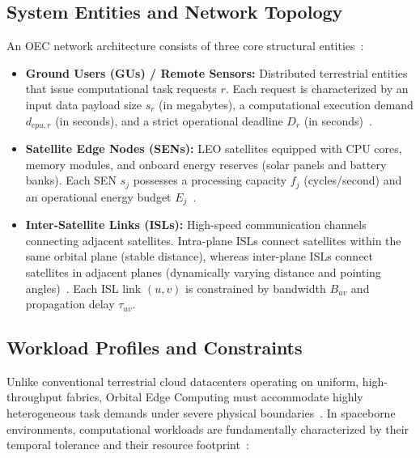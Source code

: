 \subsection{System Entities and Network Topology}

An OEC network architecture consists of three core structural entities~\cite{icdcs_satellite_2025, walker1984satellite}:
\begin{itemize}
    \item \textbf{Ground Users (GUs) / Remote Sensors:} Distributed terrestrial entities that issue computational task requests $r$. Each request is characterized by an input data payload size $s_r$ (in megabytes), a computational execution demand $d_{cpu,r}$ (in seconds), and a strict operational deadline $D_r$ (in seconds)~\cite{icdcs_satellite_2025}.
    \item \textbf{Satellite Edge Nodes (SENs):} LEO satellites equipped with CPU cores, memory modules, and onboard energy reserves (solar panels and battery banks). Each SEN $s_j$ possesses a processing capacity $f_j$ (cycles/second) and an operational energy budget $E_j$~\cite{icdcs_satellite_2025}.
    \item \textbf{Inter-Satellite Links (ISLs):} High-speed communication channels connecting adjacent satellites. Intra-plane ISLs connect satellites within the same orbital plane (stable distance), whereas inter-plane ISLs connect satellites in adjacent planes (dynamically varying distance and pointing angles)~\cite{chen2021isl, chaudhry2021laser}. Each ISL link $(u, v)$ is constrained by bandwidth $B_{uv}$ and propagation delay $\tau_{uv}$.
\end{itemize}

\subsection{Workload Profiles and Constraints}
\label{subsec:bg_workload_constraints}

Unlike conventional terrestrial cloud datacenters operating on uniform, high-throughput fabrics, Orbital Edge Computing must accommodate highly heterogeneous task demands under severe physical boundaries~\cite{icdcs_satellite_2025}. In spaceborne environments, computational workloads are fundamentally characterized by their temporal tolerance and their resource footprint~\cite{denby2019orbital, leyva2023satellite}:

